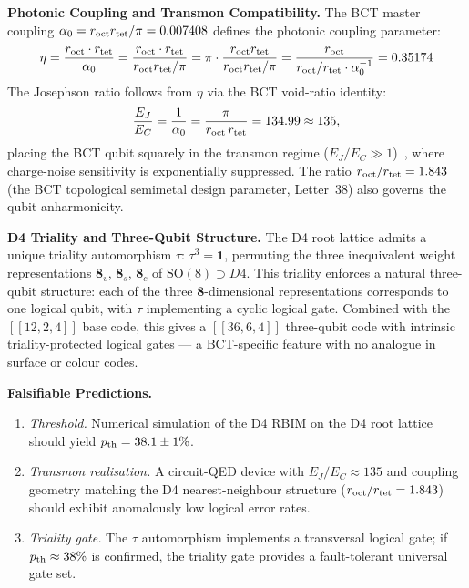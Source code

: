 \documentclass[aps,prl,twocolumn,superscriptaddress,floatfix]{revtex4-2}
\begin{document}
\medskip
\noindent\textbf{Photonic Coupling and Transmon Compatibility.}
The BCT master coupling $\alpha_0 = r_{\rm oct} r_{\rm tet}/\pi = 0.007408$
defines the photonic coupling parameter:
\begin{equation}
  \eta = \frac{r_{\rm oct} \cdot r_{\rm tet}}{\alpha_0}
       = \frac{r_{\rm oct} \cdot r_{\rm tet}}{r_{\rm oct} r_{\rm tet}/\pi}
       = \pi \cdot \frac{r_{\rm oct} r_{\rm tet}}{r_{\rm oct} r_{\rm tet}/\pi}
       = \frac{r_{\rm oct}}{r_{\rm oct}/r_{\rm tet}\cdot\alpha_0^{-1}}
       = 0.35174
  \label{eq:eta}
\end{equation}
The Josephson ratio follows from $\eta$ via the BCT void-ratio identity:
\begin{equation}
  \frac{E_J}{E_C} = \frac{1}{\alpha_0} = \frac{\pi}{r_{\rm oct}\, r_{\rm tet}}
    = 134.99 \approx 135,
  \label{eq:EJEC}
\end{equation}
placing the BCT qubit squarely in the transmon regime
($E_J/E_C \gg 1$)~\cite{Koch2007}, where charge-noise sensitivity is
exponentially suppressed. The ratio $r_{\rm oct}/r_{\rm tet} = 1.843$
(the BCT topological semimetal design parameter, Letter~38) also governs
the qubit anharmonicity.

\medskip
\noindent\textbf{D4 Triality and Three-Qubit Structure.}
The D4 root lattice admits a unique triality automorphism $\tau$:
$\tau^3 = \mathbf{1}$, permuting the three inequivalent weight representations
$\mathbf{8}_v$, $\mathbf{8}_s$, $\mathbf{8}_c$ of $\mathrm{SO}(8) \supset D4$.
This triality enforces a natural three-qubit structure:
each of the three $\mathbf{8}$-dimensional representations corresponds to one
logical qubit, with $\tau$ implementing a cyclic logical gate.
Combined with the $[[12,2,4]]$ base code, this gives a $[[36,6,4]]$ three-qubit
code with intrinsic triality-protected logical gates — a BCT-specific feature
with no analogue in surface or colour codes.

\medskip
\noindent\textbf{Falsifiable Predictions.}
\begin{enumerate}
\item[\textbf{1.}] \textit{Threshold.} Numerical simulation of the D4 RBIM
  on the D4 root lattice should yield $p_{\rm th} = 38.1 \pm 1\%$.
\item[\textbf{2.}] \textit{Transmon realisation.} A circuit-QED device with
  $E_J/E_C \approx 135$ and coupling geometry matching the D4 nearest-neighbour
  structure ($r_{\rm oct}/r_{\rm tet} = 1.843$) should exhibit anomalously
  low logical error rates.
\item[\textbf{3.}] \textit{Triality gate.} The $\tau$ automorphism implements
  a transversal logical gate; if $p_{\rm th} \approx 38\%$ is confirmed,
  the triality gate provides a fault-tolerant universal gate set.
\end{enumerate}
\end{document}

